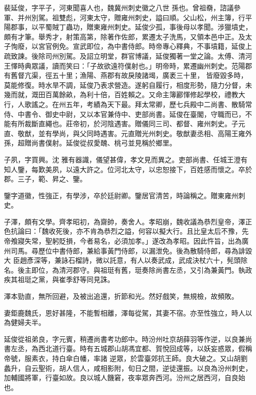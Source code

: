 \begin{pinyinscope}
 裴延俊，字平子，河東聞喜人也，魏冀州刺史徽之八世
 孫也。曾祖奣，諮議參軍、并州別駕。祖雙彪，河東太守，贈雍州刺史，謚曰順。父山松，州主簿，行平陽郡事，以平蜀賊丁蟲功，贈東雍州刺史。延俊少孤，事後母以孝聞。涉獵墳史，頗有才筆。舉秀才，射策高第，除著作佐郎，累遷太子洗馬，又領本邑中正。及太子恂廢，以宮官例免。宣武即位，為中書侍郎。時帝專心釋典，不事墳籍，延俊上疏致諫。後除司州別駕。及詔立明堂，群官博議，延俊獨著一堂之論。太傅、清河王懌時典眾議，讀而笑曰：「子故欲遠符僕射也。」明帝時，累遷幽州刺史。范陽郡有舊督亢渠，徑五十里；漁陽、燕郡有故戾陵諸堨，廣袤三十里，
 皆廢毀多時，莫能修復。時水旱不調，延俊乃表求營造。遂躬自履行，相度形勢，隨力分督，未幾而就，溉田百萬餘畝，為利十倍，百姓賴之。又命主簿酈惲修起學校，禮教大行，人歌謠之。在州五年，考績為天下最。拜太常卿，歷七兵殿中二尚書、散騎常侍、中書令、御史中尉，又以本官兼侍中、吏部尚書。延俊在臺閣，守職而已，不能有所裁斷直繩也。莊帝初，於河陰遇害。贈儀同三司、都督、雍州刺史。子元直、敬猷，並有學尚，與父同時遇害。元直贈光州刺史。敬猷妻丞相、高陽王雍外孫，超贈尚書僕射。延俊從叔愛醜、桃弓並見稱於鄉里。



 子夙，字買興。沈
 雅有器識，儀望甚偉，孝文見而異之。吏部尚書、任城王澄有知人鑒，每歎美夙，以遠大許之。位河北太守，以忠恕接下，百姓感而懷之。卒於郡。三子，範、昇之、鑒。



 鑒字道徽，性強正，有學涉，卒於廷尉卿。鑒居官清苦，時論稱之。贈東雍州刺史。



 子澤，頗有文學。齊孝昭初，為齋帥，奏舍人。孝昭崩，魏收議為恭烈皇帝，澤正色抗論曰：「魏收死後，亦不肯為恭烈之謚，何容以擬大行。且比皇太后不豫，先帝飧寢失常，聖躬貶損，今者易名，必須加孝。」遂改為孝昭。因此忤旨，出為廣州司馬。尋歷位中書侍郎，兼給事黃門侍郎，以漏泄免。後為散騎侍郎，尋為誹毀大
 臣趙彥深等，兼詠石榴詩，微以託意，有人以奏武成，武成決杖六十，髡頭除名。後主即位，為清河郡守。與祖珽有舊，珽奏除尚書左丞，又引為兼黃門。執政疾其祖珽之黨，與崔季舒等同見誅。



 澤本勁直，無所回避，及被出追還，折節和光。然好戲笑，無規檢，故頻敗。



 妻鉅鹿魏氏，恩好甚隆，不能暫相離，澤每從駕，其妻不宿。亦至性強立，時人以為健婦夫半。



 延俊從祖弟良，字元賓，稍遷尚書考功郎中。時汾州吐京胡薛羽等作逆，以良兼尚書左丞，為西北道行臺。時有五城郡山胡馮宜都、賀悅回成等，以妖妄惑眾，假稱帝號，服素衣，持白傘白幡，率諸
 逆眾，於雲臺郊抗王師。良大破之。又山胡劉蠡升，自云聖術，胡人信人，咸相影附，旬日之間，逆徒還振。以良為汾州刺史，加輔國將軍，行臺如故。良以城人饑窘，夜率眾奔西河。汾州之居西河，自良始也。




\end{pinyinscope}
